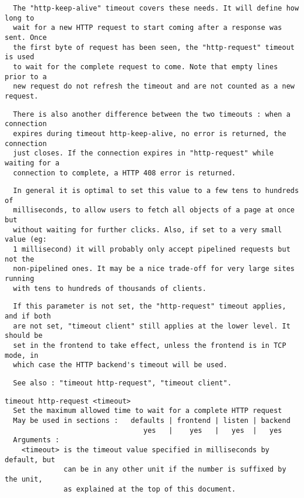 \begin{verbatim}
  The "http-keep-alive" timeout covers these needs. It will define how long to
  wait for a new HTTP request to start coming after a response was sent. Once
  the first byte of request has been seen, the "http-request" timeout is used
  to wait for the complete request to come. Note that empty lines prior to a
  new request do not refresh the timeout and are not counted as a new request.
\end{verbatim}

\begin{verbatim}
  There is also another difference between the two timeouts : when a connection
  expires during timeout http-keep-alive, no error is returned, the connection
  just closes. If the connection expires in "http-request" while waiting for a
  connection to complete, a HTTP 408 error is returned.
\end{verbatim}

\begin{verbatim}
  In general it is optimal to set this value to a few tens to hundreds of
  milliseconds, to allow users to fetch all objects of a page at once but
  without waiting for further clicks. Also, if set to a very small value (eg:
  1 millisecond) it will probably only accept pipelined requests but not the
  non-pipelined ones. It may be a nice trade-off for very large sites running
  with tens to hundreds of thousands of clients.
\end{verbatim}

\begin{verbatim}
  If this parameter is not set, the "http-request" timeout applies, and if both
  are not set, "timeout client" still applies at the lower level. It should be
  set in the frontend to take effect, unless the frontend is in TCP mode, in
  which case the HTTP backend's timeout will be used.
\end{verbatim}

\begin{verbatim}
  See also : "timeout http-request", "timeout client".
\end{verbatim}

\begin{verbatim}
timeout http-request <timeout>
  Set the maximum allowed time to wait for a complete HTTP request
  May be used in sections :   defaults | frontend | listen | backend
                                 yes   |    yes   |   yes  |   yes
  Arguments :
    <timeout> is the timeout value specified in milliseconds by default, but
              can be in any other unit if the number is suffixed by the unit,
              as explained at the top of this document.
\end{verbatim}

